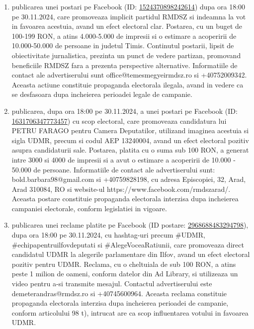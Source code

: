 \documentclass[a4paper,12pt]{article}
\begin{document}
\begin{enumerate}[leftmargin=*, label=\arabic*.)]
    \item publicarea unei postari pe Facebook (ID: \href{https://www.facebook.com/ads/library/?id=1524370898242614}{1524370898242614}) dupa ora 18:00 pe 30.11.2024, care promoveaza implicit partidul RMDSZ si indeamna la vot in favoarea acestuia, avand un efect electoral clar. Postarea, cu un buget de 100-199 RON, a atins 4.000-5.000 de impresii si o estimare a acoperirii de 10.000-50.000 de persoane in judetul Timis.  Continutul postarii, lipsit de obiectivitate jurnalistica, prezinta un punct de vedere partizan, promovand beneficiile RMDSZ fara a prezenta perspective alternative.  Informatiile de contact ale advertiserului sunt office@temesmegyeirmdsz.ro si +40752009342.  Aceasta actiune constituie propaganda electorala ilegala, avand in vedere ca se desfasoara dupa incheierea perioadei legale de campanie.
    \item publicarea, dupa ora 18:00 pe 30.11.2024, a unei postari pe Facebook (ID: \href{https://www.facebook.com/ads/library/?id=1631706347773457}{1631706347773457}) cu scop electoral, care promoveaza candidatura lui PETRU FARAGO pentru Camera Deputatilor,  utilizand imaginea acestuia si sigla UDMR,  precum si codul AEP 13240004,  avand un efect electoral pozitiv asupra candidaturii sale. Postarea, platita cu o suma sub 100 RON, a generat intre 3000 si 4000 de impresii si a avut o estimare a acoperirii de 10.000 - 50.000 de persoane.  Informatiile de contact ale advertiserului sunt: bold.barbara98@gmail.com si +40759828198, cu adresa Episcopiei, 32, Arad, Arad 310084, RO si website-ul https://www.facebook.com/rmdszarad/.  Aceasta postare constituie propaganda electorala interzisa dupa incheierea campaniei electorale, conform legislatiei in vigoare.
    \item publicarea unei reclame platite pe Facebook (ID postare: \href{https://www.facebook.com/ads/library/?id=2968688483294798}{2968688483294798}), dupa ora 18:00 pe 30.11.2024, cu hashtag-uri precum \#UDMR, \#echipapentruilfovdeputati si \#AlegeVoceaRatiunii, care promoveaza direct candidatul UDMR la alegerile parlamentare din Ilfov, avand un efect electoral pozitiv pentru UDMR.  Reclama, cu o cheltuiala de sub 100 RON, a atins peste 1 milion de oameni, conform datelor din Ad Library, si utilizeaza un video pentru a-si transmite mesajul.  Contactul advertiserului este demeterandras@rmdsz.ro si +40745600964.  Aceasta reclama constituie propaganda electorala interzisa dupa incheierea perioadei de campanie, conform articolului 98 t), intrucat are ca scop influentarea votului in favoarea UDMR.

\end{enumerate}
\end{document}

